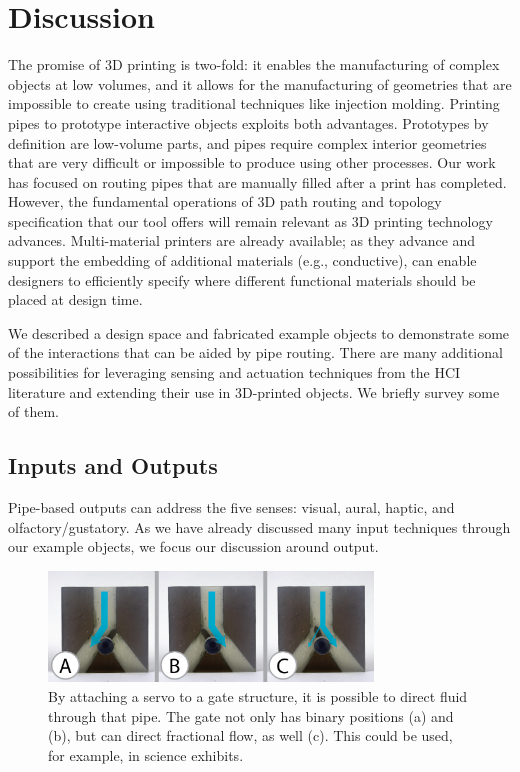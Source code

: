 \section{Discussion}

The promise of 3D printing is two-fold: it enables the manufacturing of complex objects at low volumes, and it allows for the manufacturing of geometries that are impossible to create using traditional techniques like injection molding.  Printing pipes to prototype interactive objects exploits both advantages. Prototypes by definition are low-volume parts, and pipes require complex interior geometries that are very difficult or impossible to produce using other processes. Our work has focused on routing pipes that are manually filled after a print has completed. However, the fundamental operations of 3D path routing and topology specification that our tool offers will remain relevant as 3D printing technology advances. Multi-material printers are already available; as they advance and support the embedding of additional materials (e.g., conductive), \systemname can enable designers to efficiently specify where different functional materials should be placed at design time.

We described a design space and fabricated example objects to demonstrate some of the interactions that can be aided by pipe routing. There are many additional possibilities for leveraging sensing and actuation techniques from the HCI literature and extending their use in 3D-printed objects. We briefly survey some of them.

\subsection{Inputs and Outputs}

Pipe-based outputs can address the five senses: visual, aural, haptic, and olfactory/gustatory.  As we have already discussed many input techniques through our example objects, we focus our discussion around output.  %

\begin{figure}[h]
\centering
    \includegraphics[width=3.4in]{figures/gates.png}
\caption{By attaching a servo to a gate structure, it is possible to direct fluid through that pipe.  The gate not only has binary positions (a) and (b), but can direct fractional flow, as well (c).  This could be used, for example, in science exhibits.}
\label{fig:direct}
\end{figure}


